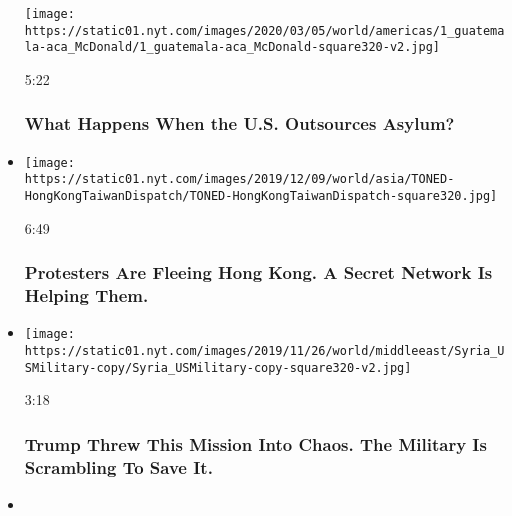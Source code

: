 \begin{itemize}
  \texttt{[image: https://static01.nyt.com/images/2020/03/05/world/americas/1\_guatemala-aca\_McDonald/1\_guatemala-aca\_McDonald-square320-v2.jpg]}

  5:22

  \hypertarget{what-happens-when-the-us-outsources-asylum}{%
  \subsubsection{What Happens When the U.S. Outsources
  Asylum?}\label{what-happens-when-the-us-outsources-asylum}}
\item
  \href{https://www.nytimes.com/video/world/asia/100000006864895/hong-kong-protests-taiwan-secret-network.html?action=click\&module=video-series-bar\&region=header\&pgtype=Article\&playlistId=video/on-the-ground}{}

  \texttt{[image: https://static01.nyt.com/images/2019/12/09/world/asia/TONED-HongKongTaiwanDispatch/TONED-HongKongTaiwanDispatch-square320.jpg]}

  6:49

  \hypertarget{protesters-are-fleeing-hong-kong-a-secret-network-is-helping-them}{%
  \subsubsection{Protesters Are Fleeing Hong Kong. A Secret Network Is
  Helping
  Them.}\label{protesters-are-fleeing-hong-kong-a-secret-network-is-helping-them}}
\item
  \href{https://www.nytimes.com/video/world/middleeast/100000006821104/trump-syria-military.html?action=click\&module=video-series-bar\&region=header\&pgtype=Article\&playlistId=video/on-the-ground}{}

  \texttt{[image: https://static01.nyt.com/images/2019/11/26/world/middleeast/Syria\_USMilitary-copy/Syria\_USMilitary-copy-square320-v2.jpg]}

  3:18

  \hypertarget{trump-threw-this-mission-into-chaos-the-military-is-scrambling-to-save-it}{%
  \subsubsection{Trump Threw This Mission Into Chaos. The Military Is
  Scrambling To Save
  It.}\label{trump-threw-this-mission-into-chaos-the-military-is-scrambling-to-save-it}}
\item
  \href{https://www.nytimes.com/video/world/americas/100000006795557/chile-protesters-shot-eye.html?action=click\&module=video-series-bar\&region=header\&pgtype=Article\&playlistId=video/on-the-ground}{}


\end{itemize}
